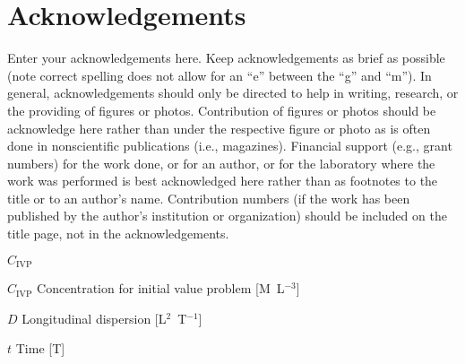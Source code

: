\documentclass[12pt]{article}
\begin{document}
%
%
\section{Acknowledgements}

Enter your acknowledgements here.  Keep acknowledgements as brief as possible (note correct spelling does not allow for an ``e'' between the ``g'' and ``m'').  In general, acknowledgements should only be directed to help in writing, research, or the providing of figures or photos.  Contribution of figures or photos should be acknowledge here rather than under the respective figure or photo as is often done in nonscientific publications (i.e., magazines).  Financial support (e.g., grant numbers) for the work done, or for an author, or for the laboratory where the work was performed is best acknowledged here rather than as footnotes to the title or to an author's name.  Contribution numbers (if the work has been published by the author's institution or organization) should be included on the title page, not in the acknowledgements.

\begin{notation}{$C_{\text{IVP}}$} %
\item[$C_{\text{IVP}}$]          Concentration for initial value problem [M~L$^{-3}$]
\item[$D$]                       Longitudinal dispersion [L$^2$~T$^{-1}$]
\item[$t$]                       Time [T]
\end{notation}

%
{}
{\clearpage}


\end{document}
